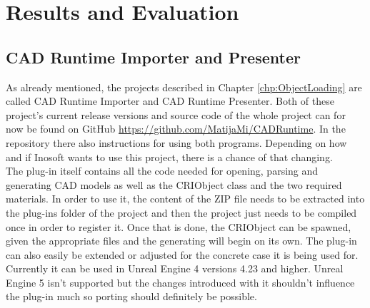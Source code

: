 \chapter{Results and Evaluation}\label{chp:Results}

\section{CAD Runtime Importer and Presenter}

As already mentioned, the projects described in Chapter \ref{chp:ObjectLoading} are called CAD Runtime Importer and CAD Runtime Presenter. Both of these project's current release versions and source code of the whole project can for now be found on GitHub \url{https://github.com/MatijaMi/CADRuntime}. In the repository there also instructions for using both programs. Depending on how and if Inosoft wants to use this project, there is a chance of that changing.\\
The plug-in itself contains all the code needed for opening, parsing and generating CAD models as well as the CRIObject class and the two required materials. In order to use it, the content of the ZIP file needs to be extracted into the plug-ins folder of the project and then the project just needs to be compiled once in order to register it. Once that is done, the CRIObject can be spawned, given the appropriate files and the generating will begin on its own. The plug-in can also easily be extended or adjusted for the concrete case it is being used for. Currently it can be used in Unreal Engine 4 versions 4.23 and higher. Unreal Engine 5 isn't supported but the changes introduced with it shouldn't influence the plug-in much so porting should definitely be possible.\\
